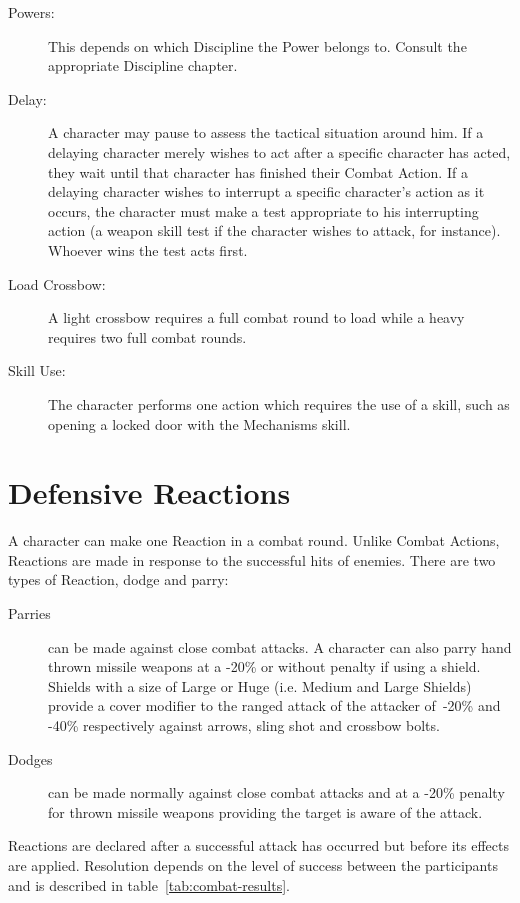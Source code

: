 \begin{description}
\item[Powers:] This depends on which Discipline the Power belongs to. Consult the appropriate Discipline chapter.
\item[Delay:] A character may pause to assess the tactical situation around him. If a delaying character merely wishes to act after a specific character has acted, they wait until that character has finished their Combat Action. If a delaying character wishes to interrupt a specific character’s action as it occurs, the character must make a test appropriate to his interrupting action (a weapon skill test if the character wishes to attack, for instance). Whoever wins the test acts first. 
\item[Load Crossbow:] A light crossbow requires a full combat round to load while a heavy requires two full combat rounds.
\item[Skill Use:] The character performs one action which requires the use of a skill, such as opening a locked door with the Mechanisms skill.
\end{description}


\section{Defensive Reactions}
\label{sec:defensive-reactions}
A character can make one Reaction in a combat round. Unlike Combat Actions, Reactions are made in response to the successful hits of enemies. There are two types of Reaction, dodge and parry:

\begin{description}
	\item[Parries] can be made against close combat attacks. A character can also parry hand thrown missile weapons at a -20\% or without penalty if using a shield. Shields with a size of Large or Huge (i.e. Medium and Large Shields) provide a cover modifier to the ranged attack of the attacker of -20\% and -40\% respectively against arrows, sling shot and crossbow bolts. 
	\item[Dodges] can be made normally against close combat attacks and at a -20\% penalty for thrown missile weapons providing the target is aware of the attack.  
\end{description}

\noindent Reactions are declared after a successful attack has occurred but before its effects are applied. Resolution depends on the level of success between the participants and is described in table~\ref{tab:combat-results}.

